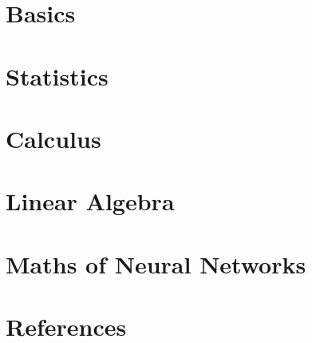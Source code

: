 \section[Basics]{Basics}









\section[Stats]{Statistics}






\section[Calculus]{Calculus}








\section[LinAlg]{Linear Algebra}







\section[DL]{Maths of Neural Networks}

 
\section[Refs]{References}


